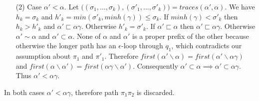 \documentclass[AMA,STIX1COL]{WileyNJD-v2}
\begin{document}
\begin{proofEnd}
\begin{itemize}[itemsep=0.2em, topsep=0.5em]
    \item[(2)]
        Case $\alpha' < \alpha$.
        Let $\big( (\sigma_1, \hdots, \sigma_k), (\sigma'_1, \hdots, \sigma'_k) \big) = traces (\alpha', \alpha)$.
        We have $h_k = \sigma_k$ and $h'_k = min (\sigma'_k, minh(\gamma)) \leq \sigma_k$.
        If $minh(\gamma) < \sigma'_k$ then $h_k > h'_k$ and $\alpha' \sqsubset \alpha \gamma$.
        Otherwise $h'_k = \sigma'_k$.
        If $\alpha' \sqsubset \alpha$ then $\alpha' \sqsubset \alpha \gamma$.
        Otherwise $\alpha' \sim \alpha$ and $\alpha' \subset \alpha$.
        None of $\alpha$ and $\alpha'$ is a proper prefix of the other
        because otherwise the longer path has an $\epsilon$-loop through $q_1$, which contradicts our assumption about $\pi_1$ and $\pi'_1$.
        Therefore $first (\alpha' \backslash \alpha) = first (\alpha' \backslash \alpha \gamma)$
        and $first (\alpha \backslash \alpha') = first (\alpha \gamma \backslash \alpha')$.
        Consequently $\alpha' \subset \alpha \implies \alpha' \subset \alpha \gamma$.
        Thus $\alpha' < \alpha \gamma$.
    \end{itemize}
    In both cases $\alpha' < \alpha \gamma$, therefore path $\pi_1 \pi_2$ is discarded.
\end{proofEnd}
\vspace{-0.5em}
\end{document}
